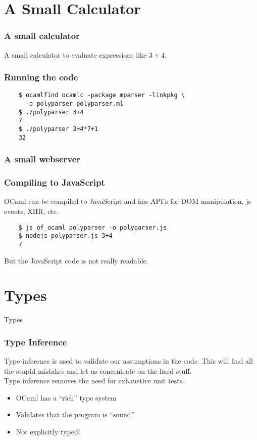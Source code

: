 \documentclass[xcolor=svgnames]{beamer}
\renewcommand{\_}{\mathunderscore}
\begin{document}
\section{A Small Calculator}
\begin{frame}[fragile]
  \frametitle{A small calculator}
  A small calculator to evaluate expressions like $3 + 4$.
  \pause
  
\end{frame}

\begin{frame}[fragile]
  \frametitle{Running the code}
  \begin{lstlisting}
    $ ocamlfind ocamlc -package mparser -linkpkg \
      -o polyparser polyparser.ml
    $ ./polyparser 3+4
    7
    $ ./polyparser 3+4*7+1
    32
  \end{lstlisting}
\end{frame}

\begin{frame}[fragile]
  \frametitle{A small webserver}
  
\end{frame}

\begin{frame}[fragile]
  \frametitle{Compiling to JavaScript}
  OCaml can be compiled to JavaScript and has API's for DOM
  manipulation, js events, XHR, etc.

  \begin{lstlisting}
    $ js_of_ocaml polyparser -o polyparser.js
    $ nodejs polyparser.js 3+4
    7
  \end{lstlisting}
  \pause
  But the JavaScript code is not really readable.
\end{frame}

\section{Types}
\begin{frame}[fragile]
  \begin{center}
    \Huge Types
  \end{center}
\end{frame}

\begin{frame}[fragile]
  \frametitle{Type Inference}
  Type inference is used to validate our assumptions in the code. This
  will find all the stupid mistakes and let us concentrate on the hard
  stuff.\newline\\
  \pause
  Type inference removes the need for exhaustive unit tests.\newline
  \pause
  \begin{itemize}
    \item OCaml has a ``rich'' type system
    \item Validates that the program is ``sound''
    \item Not explicitly typed!
  \end{itemize}
\end{frame}
\end{document}
